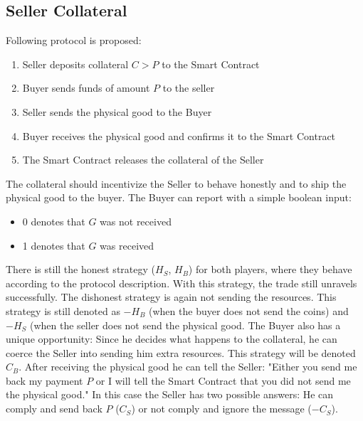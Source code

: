 \documentclass{cacthesis}
\begin{document}
\subsection{Seller Collateral}
Following protocol is proposed:
\begin{enumerate}
    \item Seller deposits collateral $C > P$ to the Smart Contract
    \item Buyer sends funds of amount $P$ to the seller 
    \item Seller sends the physical good to the Buyer
    \item Buyer receives the physical good and confirms it to the Smart Contract
    \item The Smart Contract releases the collateral of the Seller
\end{enumerate}
The collateral should incentivize the Seller to behave honestly and to ship the physical good to the buyer. The Buyer can report with a simple boolean input: 
\begin{itemize}
    \item 0 denotes that $G$ was not received
    \item 1 denotes that $G$ was received
\end{itemize}
There is still the honest strategy ($H_S$, $H_B$) for both players, where they behave according to the protocol description. With this strategy, the trade still unravels successfully.\newline
The dishonest strategy is again not sending the resources. This strategy is still denoted as $-H_B$ (when the buyer does not send the coins) and $-H_S$ (when the seller does not send the physical good.\newline
The Buyer also has a unique opportunity: Since he decides what happens to the collateral, he can coerce the Seller into sending him extra resources. This strategy will be denoted $C_B$.  After receiving the physical good he can tell the Seller: "Either you send me back my payment $P$ or I will tell the Smart Contract that you did not send me the physical good." In this case the Seller has two possible answers: He can comply and send back $P$ ($C_S$) or not comply and ignore the message ($-C_S$).\newline

\end{document}
